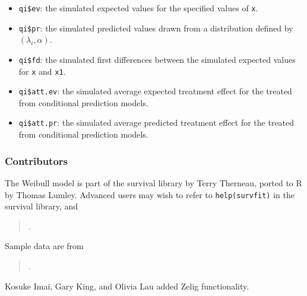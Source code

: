 \begin{itemize}
   \begin{itemize}
   \item {\tt qi\$ev}: the simulated expected values for the specified
     values of {\tt x}.
   \item {\tt qi\$pr}: the simulated predicted values drawn from a
     distribution defined by $(\lambda_i, \alpha)$.  
   \item {\tt qi\$fd}: the simulated first differences between the
     simulated expected values for {\tt x} and {\tt x1}.  
   \item {\tt qi\$att.ev}: the simulated average expected treatment
     effect for the treated from conditional prediction models.  
   \item {\tt qi\$att.pr}: the simulated average predicted treatment
     effect for the treated from conditional prediction models.  
   \end{itemize}
\end{itemize}

\subsubsection{Contributors}

The Weibull model is part of the survival library by Terry Therneau,
ported to R by Thomas Lumley.  Advanced users may wish to refer to
\texttt{help(survfit)} in the survival library, and 
\begin{verse}
.
\end{verse}

Sample data are from 
\begin{verse}
.  
\end{verse}

Kosuke Imai, Gary King, and Olivia Lau added Zelig functionality.  












